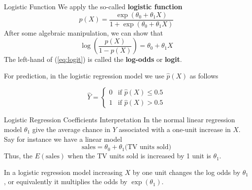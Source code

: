 \documentclass{beamer}
\begin{document}
\begin{frame}{Logistic Function}
	We apply the so-called {\bf logistic function}
	\begin{equation*}
		p(X)= \frac{\exp(\theta_0+ \theta_1 X)}{1+ \exp(\theta_0+\theta_1 X)} 
	\end{equation*}
	After some algebraic manipulation, we can show that
	\begin{equation}
		\log \left( \frac{p(X)}{1-p(X)} \right) = \theta_0 + \theta_1 X
\label{eq:logit}	
\end{equation}
The left-hand of (\ref{eq:logit}) is called the {\bf log-odds} or {\bf logit}.

For prediction, in the logistic regression model we use $\hat{p}(X)$ as follows 

\begin{equation*}
	\hat{Y}=
	\begin{cases}
		0 & \textrm{if } \hat{p}(X)  \le 0.5 \\
		1 &  \textrm{if } \hat{p}(X) > 0.5
	\end{cases}
\end{equation*}
\end{frame}

\begin{frame}{Logistic Regression Coefficients Interpretation}
	In the normal linear regression model $\theta_1$ give the average chance in $Y$ associated with a one-unit increase in $X$.  Say for instance we have a linear model
	\begin{equation*}
		{\textrm{sales}} = {\theta}_0+ {\theta}_1 \textrm{(TV units sold)}
	\end{equation*}
	Thus, the $E(\textrm{sales})$ when the TV units sold is increased by 1 unit is ${\theta}_1$.
	
	In a logistic regression model increasing $X$ by one unit changes the log odds by $\theta_1$, or equivalently it multiplies the odds by $\exp(\theta_1)$. 
	
\end{frame}
\end{document}
